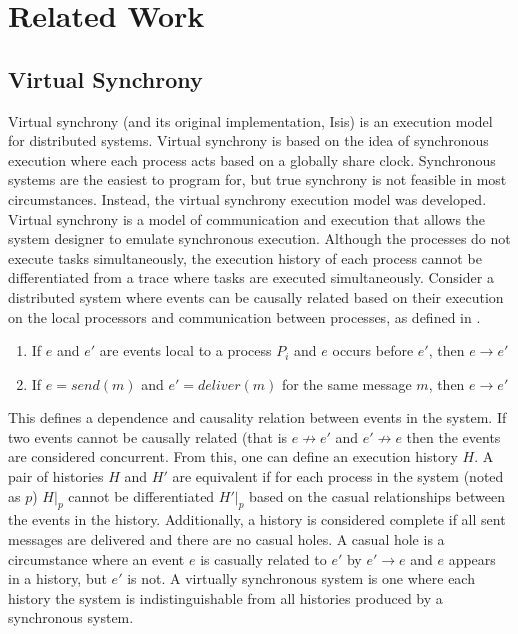 \chapter{Related Work}
\section{Virtual Synchrony}
Virtual synchrony (and its original implementation, Isis) is an execution model for distributed systems. Virtual synchrony is based on the idea of synchronous execution where each process acts based on a globally share clock. Synchronous systems are the easiest to program for, but true synchrony is not feasible in most circumstances. Instead, the virtual synchrony execution model was developed. 
Virtual synchrony is a model of communication and execution that allows the system designer to emulate synchronous execution. Although the processes do not execute tasks simultaneously, the execution history of each process cannot be differentiated from a trace where tasks are executed simultaneously. 
Consider a distributed system where events can be causally related based on their execution on the local processors and communication between processes, as defined in \cite[p~.101]{ISISTOOLKIT}. 
\begin{enumerate}
    \item If $e$ and $e'$ are events local to a process $P_{i}$ and $e$ occurs before $e'$, then $e \rightarrow e'$
    \item If $e = send(m)$ and $e'=deliver(m)$ for the same message $m$, then $e \rightarrow e'$
\end{enumerate} \cite[p~.101]{ISISTOOLKIT}
This defines a dependence and causality relation between events in the system. If two events cannot be causally related (that is $e \not\rightarrow e'$ and $e' \not\rightarrow e$ then the events are considered concurrent. From this, one can define an execution history $H$. A pair of histories $H$ and $H'$ are equivalent if for each process in the system (noted as $p$) $H|_{p}$ cannot be differentiated $H'|_{p}$ based on the casual relationships between the events in the history. \cite[p~.103]{ISISTOOLKIT} Additionally, a history is considered complete if all sent messages are delivered and there are no casual holes. A casual hole is a circumstance where an event $e$ is casually related to $e'$ by $e' \rightarrow e$ and $e$ appears in a history, but $e'$ is not. A virtually synchronous system is one where each history the system is indistinguishable from all histories produced by a synchronous system. \cite[p~.104]{ISISTOOLKIT}
